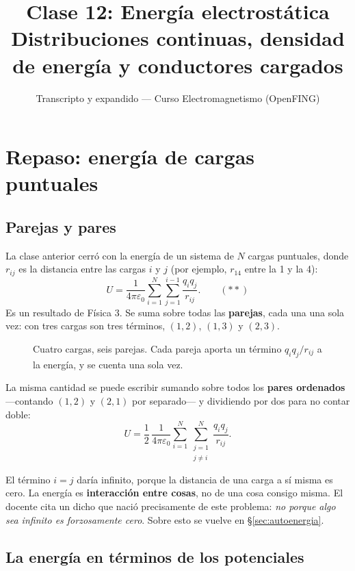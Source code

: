 \documentclass[12pt,a4paper]{article}
\title{\textbf{Clase 12: Energía electrostática} \\[0.3em]
        \large{Distribuciones continuas, densidad de energía y conductores cargados}}
\author{Transcripto y expandido --- Curso Electromagnetismo (OpenFING)}
\date{}
\begin{document}
\maketitle
\thispagestyle{empty}
\newpage

\tableofcontents
\newpage

\section{Repaso: energía de cargas puntuales}

\subsection{Parejas y pares}

La clase anterior cerró con la energía de un sistema de $N$ cargas puntuales,
donde $r_{ij}$ es la distancia entre las cargas $i$ y $j$ (por ejemplo, $r_{14}$
entre la 1 y la 4):
\[
U = \frac{1}{4\pi\varepsilon_0}\sum_{i=1}^{N}\sum_{j=1}^{i-1}\frac{q_i q_j}{r_{ij}} .
\qquad(\ast\ast)
\]
Es un resultado de Física 3. Se suma sobre todas las \textbf{parejas}, cada una
una sola vez: con tres cargas son tres términos, $(1,2)$, $(1,3)$ y $(2,3)$.

\begin{figure}[H]
  \centering
  
  \caption{Cuatro cargas, seis parejas. Cada pareja aporta un término
  $q_iq_j/r_{ij}$ a la energía, y se cuenta una sola vez.}
\end{figure}

La misma cantidad se puede escribir sumando sobre todos los \textbf{pares
ordenados} ---contando $(1,2)$ y $(2,1)$ por separado--- y dividiendo por dos
para no contar doble:
\[
U = \frac{1}{2}\,\frac{1}{4\pi\varepsilon_0}\sum_{i=1}^{N}\sum_{\substack{j=1\\ j\neq i}}^{N}\frac{q_i q_j}{r_{ij}} .
\]

\begin{warnbox}
El término $i=j$ daría infinito, porque la distancia de una carga a sí misma es
cero. La energía es \textbf{interacción entre cosas}, no de una cosa consigo
misma. El docente cita un dicho que nació precisamente de este problema:
\emph{no porque algo sea infinito es forzosamente cero}. Sobre esto se vuelve en
§\ref{sec:autoenergia}.
\end{warnbox}

\subsection{La energía en términos de los potenciales}
\end{document}
